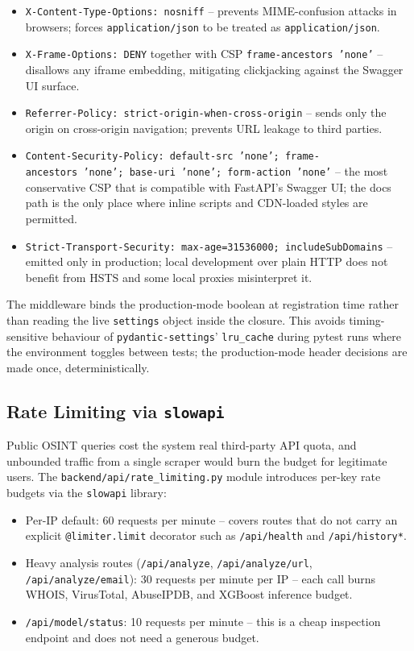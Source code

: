 \begin{itemize}
\item
  \texttt{X-Content-Type-Options:\ nosniff} -- prevents MIME-confusion attacks in browsers; forces \texttt{application/json} to be treated as \texttt{application/json}.
\item
  \texttt{X-Frame-Options:\ DENY} together with CSP \texttt{frame-ancestors\ 'none'} -- disallows any iframe embedding, mitigating clickjacking against the Swagger UI surface.
\item
  \texttt{Referrer-Policy:\ strict-origin-when-cross-origin} -- sends only the origin on cross-origin navigation; prevents URL leakage to third parties.
\item
  \texttt{Content-Security-Policy:\ default-src\ 'none';\ frame-ancestors\ 'none';\ base-uri\ 'none';\ form-action\ 'none'} -- the most conservative CSP that is compatible with FastAPI's Swagger UI; the docs path is the only place where inline scripts and CDN-loaded styles are permitted.
\item
  \texttt{Strict-Transport-Security:\ max-age=31536000;\ includeSubDomains} -- emitted only in production; local development over plain HTTP does not benefit from HSTS and some local proxies misinterpret it.
\end{itemize}

The middleware binds the production-mode boolean at registration time rather than reading the live \texttt{settings} object inside the closure. This avoids timing-sensitive behaviour of \texttt{pydantic-settings}' \texttt{lru\_cache} during pytest runs where the environment toggles between tests; the production-mode header decisions are made once, deterministically.

\subsection{Rate Limiting via \texttt{slowapi}}

Public OSINT queries cost the system real third-party API quota, and unbounded traffic from a single scraper would burn the budget for legitimate users. The \texttt{backend/api/rate\_limiting.py} module introduces per-key rate budgets via the \texttt{slowapi} library:

\begin{itemize}
\item
  Per-IP default: 60 requests per minute -- covers routes that do not carry an explicit \texttt{@limiter.limit} decorator such as \texttt{/api/health} and \texttt{/api/history*}.
\item
  Heavy analysis routes (\texttt{/api/analyze}, \texttt{/api/analyze/url}, \texttt{/api/analyze/email}): 30 requests per minute per IP -- each call burns WHOIS, VirusTotal, AbuseIPDB, and XGBoost inference budget.
\item
  \texttt{/api/model/status}: 10 requests per minute -- this is a cheap inspection endpoint and does not need a generous budget.
\end{itemize}

